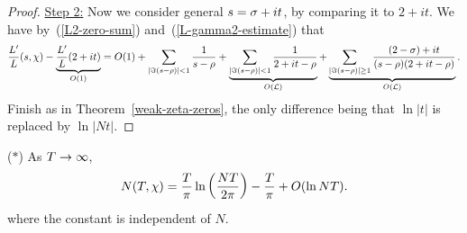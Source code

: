 \begin{proof}
\noindent\underline{Step 2:} Now we consider general $s=\sigma+it$, by comparing it to $2+it$. We have by~(\ref{L2-zero-sum}) and~(\ref{L-gamma2-estimate}) that
\[
\frac{L'}{L}(s,\chi)-\underbrace{\frac{L'}{L}(2+it)}_{O(1)}
=O(1)+
\sum_{|\Im(s-\rho)|<1}\frac{1}{s-\rho}+\underbrace{\sum_{|\Im(s-\rho)|<1}\frac{1}{2+it-\rho}}_{O(\mathcal{L})}+
\underbrace{\sum_{|\Im(s-\rho)|\ge1}\frac{(2-\sigma)+it}{(s-\rho)(2+it-\rho)}}_{O(\mathcal{L})}.
\]
Finish as in Theorem~\ref{weak-zeta-zeros}, the only difference being that $\ln|t|$ is replaced by $\ln|Nt|$.
%
\end{proof}
\begin{thm}($*$) 
As $T\to \infty$,
\[
N(T,\chi)=\frac{T}{\pi}\ln\left( {\frac{NT}{2\pi}} \right)-\frac{T}{\pi}+O(\ln NT).
\]
where the constant is independent of $N$.
\end{thm}
